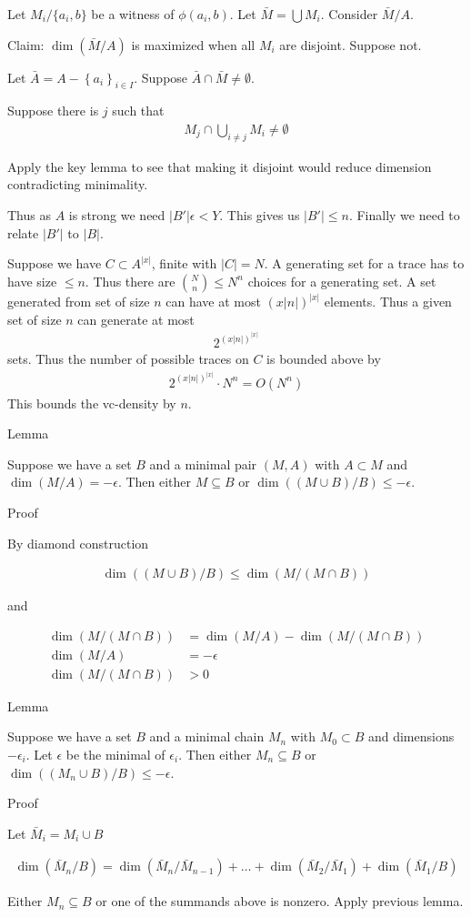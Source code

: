 \documentclass{amsart}
\newcommand{\curly}[1]{\left\{#1\right\}}
\begin{document}
Let $M_i / \{a_i, b\}$ be a witness of $\phi(a_i, b)$.
Let $\bar M = \bigcup M_i$.
Consider $\bar M / A$.

Claim: $\dim(\bar M / A)$ is maximized when all $M_i$ are disjoint.
Suppose not.

Let $\bar A = A - \curly{a_i}_{i \in I}$. Suppose $\bar A \cap \bar M \neq \emptyset$.

Suppose there is $j$ such that
\begin{align*}
	M_j \cap \bigcup_{i \neq j} M_i \neq \emptyset
\end{align*}

Apply the key lemma to see that making it disjoint would reduce dimension contradicting minimality.

Thus as $A$ is strong we need $|B'| \epsilon < Y$.
This gives us $|B'| \leq n$.
Finally we need to relate $|B'|$ to $|B|$.

Suppose we have $C \subset A^{|x|}$, finite with $|C| = N$.
A generating set for a trace has to have size $\leq n$.
Thus there are ${N \choose n} \leq N^n$ choices for a generating set.
A set generated from set of size $n$ can have at most $(x|n|)^{|x|}$ elements.
Thus a given set of size $n$ can generate at most
\begin{align*}
	2^{(x|n|)^{|x|}}
\end{align*}
sets.
Thus the number of possible traces on $C$ is bounded above by
\begin{align*}
  2^{(x|n|)^{|x|}} \cdot N^n = O(N^n)
\end{align*}
This bounds the vc-density by $n$.

Lemma

Suppose we have a set $B$ and a minimal pair $(M, A)$ with $A \subset M$ and $\dim(M/A) = -\epsilon$.
Then either $M \subseteq B$ or $\dim((M \cup B)/B) \leq -\epsilon$.

Proof

By diamond construction

\begin{align*}
	\dim((M \cup B)/B) \leq \dim(M / (M \cap B))
\end{align*}

and 

\begin{align*}
	\dim(M / (M \cap B)) &= \dim (M/A) - \dim(M / (M \cap B)) \\
	\dim (M/A) &= -\epsilon \\
	\dim(M / (M \cap B)) &> 0
\end{align*}


Lemma

Suppose we have a set $B$ and a minimal chain $M_n$ with $M_0 \subset B$ and dimensions $-\epsilon_i$.
Let $\epsilon$ be the minimal of $\epsilon_i$.
Then either $M_n \subseteq B$ or $\dim((M_n \cup B)/B) \leq -\epsilon$.

Proof

Let $\bar M_i = M_i \cup B$

\begin{align*}
	\dim(\bar M_n/B) = \dim(\bar M_n/\bar M_{n-1}) + \ldots + \dim(\bar M_2/\bar M_1) + \dim(\bar M_1/B)
\end{align*}

Either $M_n \subseteq B$ or one of the summands above is nonzero.
Apply previous lemma.
\end{document}
